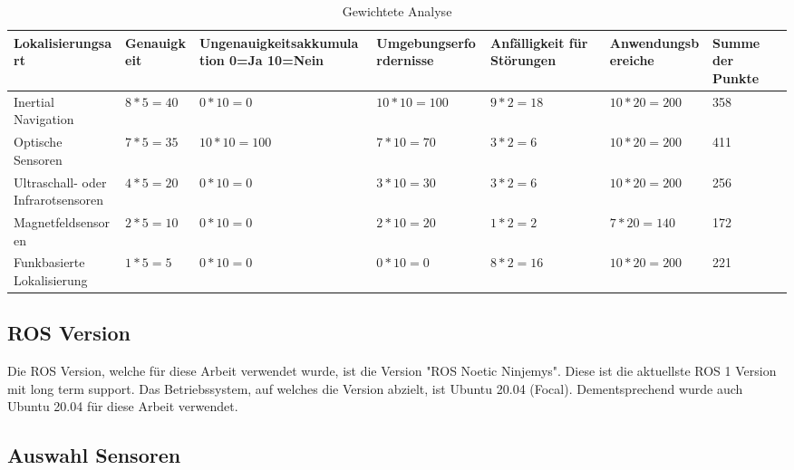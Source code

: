 \begin{table}[H]
    \fontsize{6}{11}\selectfont
    \begin{center}
        \begin{tabular}{|p{2cm}|p{1.3cm}|p{2cm}|p{1.5cm}|p{2cm}|p{2cm}|p{1.5cm}|}
            \hline
            \textbf{Lokalisier\-ungsart} & \textbf{Genauig\-keit} & \textbf{Ungenauigkeits\-akkumulation 0=Ja 10=Nein} & \textbf{Umgebungs\-erfordernisse} & \textbf{Anfälligkeit für Störungen} & \textbf{Anwendungs\-bereiche} & \textbf{Summe der Punkte} \\\hline
            \rowcolor{green}
            Inertial Navigation & $8*5=40$ & $0*10=0$ & $10*10=100$ & $9*2=18$ & $10*20=200$ & 358 \\\hline
            \rowcolor{green}
            Optische Sensoren & $7*5=35$ & $10*10=100$ & $7*10=70$ & $3*2=6$ & $10*20=200$& 411 \\\hline
            Ultraschall- oder Infrarotsensoren & $4*5=20$ & $0*10=0$ & $3*10=30$ & $3*2=6$ & $10*20=200$& 256 \\\hline
            Magnetfeldsensoren & $2*5=10$ & $0*10=0$ & $2*10=20$ & $1*2=2$ & $7*20=140$ & 172 \\\hline
            Funkbasierte Lokalisierung & $1*5=5$ & $0*10=0$ & $0*10=0$ & $8*2=16$ & $10*20=200$ & 221 \\\hline
        \end{tabular}
        \caption{Gewichtete Analyse}\label{tab:vergleich-gewichtung}
    \end{center}
\end{table}


\subsection{ROS Version}

Die \ac{ROS} Version, welche für diese Arbeit verwendet wurde, ist die Version "ROS Noetic Ninjemys". Diese ist die aktuellste ROS 1 Version mit long term support. Das Betriebssystem, auf welches die Version abzielt, ist Ubuntu 20.04 (Focal). Dementsprechend wurde auch Ubuntu 20.04 für diese Arbeit verwendet.

\subsection{Auswahl Sensoren}

